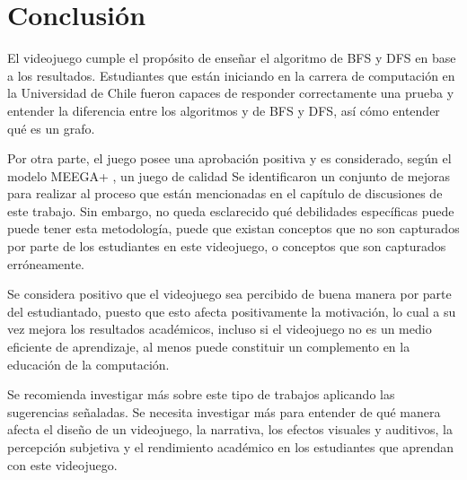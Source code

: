\chapter{Conclusión}

El videojuego cumple el propósito de enseñar el algoritmo de BFS y DFS en base a los resultados. Estudiantes que están iniciando en la carrera de computación en la Universidad de Chile fueron capaces de responder correctamente una prueba y entender la diferencia entre los algoritmos y de BFS y DFS, así cómo entender qué es un grafo.

Por otra parte, el juego posee una aprobación positiva y es considerado, según el modelo MEEGA+ \cite{meegaplus}, un juego de calidad %
Se identificaron un conjunto de mejoras para realizar al proceso que están mencionadas en el capítulo de discusiones de este trabajo. Sin embargo, no queda esclarecido qué debilidades específicas puede puede tener esta metodología, puede que existan conceptos que no son capturados por parte de los estudiantes en este videojuego, o conceptos que son capturados erróneamente.

Se considera positivo que el videojuego sea percibido de buena manera por parte del estudiantado, puesto que esto afecta positivamente la motivación, lo cual a su vez mejora los resultados académicos, incluso si el videojuego no es un medio eficiente de aprendizaje, al menos puede constituir un complemento en la educación de la computación.

Se recomienda investigar más sobre este tipo de trabajos aplicando las sugerencias señaladas. Se necesita investigar más para entender de qué manera afecta el diseño de un videojuego, la narrativa, los efectos visuales y auditivos, la percepción subjetiva y el rendimiento académico en los estudiantes que aprendan con este videojuego.